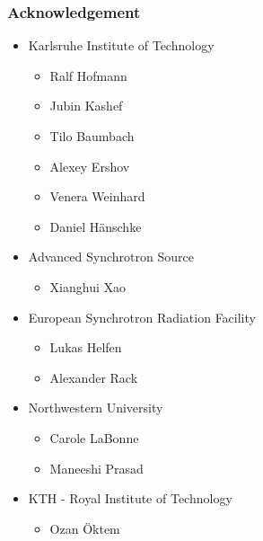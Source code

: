 \documentclass{beamer}
\begin{document}
\begin{frame}
  \frametitle{Acknowledgement}
  \begin{itemize}
  \item  Karlsruhe Institute of Technology
    \begin{itemize}
      \item Ralf Hofmann
      \item Jubin Kashef
      \item Tilo Baumbach
      \item Alexey Ershov
      \item Venera Weinhard
      \item Daniel Hänschke
    \end{itemize}
  \item Advanced Synchrotron Source
    \begin{itemize}
    \item Xianghui Xao
    \end{itemize}
  \item European Synchrotron Radiation Facility
    \begin{itemize}
    \item Lukas Helfen
    \item Alexander Rack
    \end{itemize}
  \item Northwestern University
    \begin{itemize}
    \item Carole LaBonne
    \item Maneeshi Prasad
    \end{itemize}
  \item KTH - Royal Institute of Technology
    \begin{itemize}
    \item Ozan Öktem
    \end{itemize}
  \end{itemize}
\end{frame}
\end{document}

